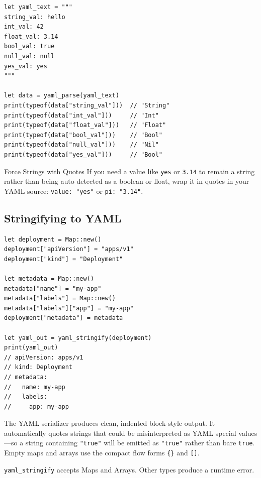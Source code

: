 \begin{lstlisting}[language=Lattice, caption={YAML scalar auto-detection}]
let yaml_text = """
string_val: hello
int_val: 42
float_val: 3.14
bool_val: true
null_val: null
yes_val: yes
"""

let data = yaml_parse(yaml_text)
print(typeof(data["string_val"]))  // "String"
print(typeof(data["int_val"]))     // "Int"
print(typeof(data["float_val"]))   // "Float"
print(typeof(data["bool_val"]))    // "Bool"
print(typeof(data["null_val"]))    // "Nil"
print(typeof(data["yes_val"]))     // "Bool"
\end{lstlisting}

\begin{tipbox}{Force Strings with Quotes}
If you need a value like \texttt{yes} or \texttt{3.14} to remain a string
rather than being auto-detected as a boolean or float, wrap it in quotes in
your YAML source: \texttt{value: "yes"} or \texttt{pi: "3.14"}.
\end{tipbox}

\subsection{Stringifying to YAML}

\begin{lstlisting}[language=Lattice, caption={Generating YAML from Lattice values}]
let deployment = Map::new()
deployment["apiVersion"] = "apps/v1"
deployment["kind"] = "Deployment"

let metadata = Map::new()
metadata["name"] = "my-app"
metadata["labels"] = Map::new()
metadata["labels"]["app"] = "my-app"
deployment["metadata"] = metadata

let yaml_out = yaml_stringify(deployment)
print(yaml_out)
// apiVersion: apps/v1
// kind: Deployment
// metadata:
//   name: my-app
//   labels:
//     app: my-app
\end{lstlisting}

The YAML serializer produces clean, indented block-style output. It
automatically quotes strings that could be misinterpreted as YAML special
values---so a string containing \texttt{"true"} will be emitted as
\texttt{"true"} rather than bare \texttt{true}. Empty maps and arrays use
the compact flow forms \texttt{\{\}} and \texttt{[]}.

\lstinline|yaml_stringify| accepts Maps and Arrays. Other types produce a
runtime error.

